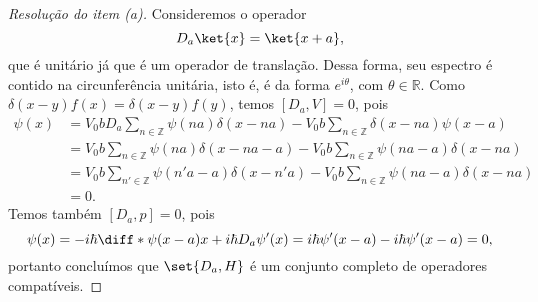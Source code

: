 \begin{proof}[Resolução do item (a)]
    Consideremos o operador
    \begin{equation*}
        D_a \ket{x} = \ket{x + a},
    \end{equation*}
    que é unitário já que é um operador de translação. Dessa forma, seu espectro é contido na circunferência unitária, isto é, é da forma \(e^{i\theta}\), com \(\theta \in \mathbb{R}\). Como \(\delta(x - y)f(x) = \delta(x - y)f(y)\), temos \([D_a, V] = 0\), pois
    \begin{align*}
        [D_a, V]\psi(x) &= V_0 bD_a \sum_{n \in \mathbb{Z}} \psi(na)\delta(x - na) - V_0 b\sum_{n \in \mathbb{Z}} \delta(x - na)\psi(x - a)\\
                        &= V_0 b\sum_{n \in \mathbb{Z}}\psi(na) \delta(x - na - a) - V_0 b\sum_{n \in \mathbb{Z}} \psi(na - a) \delta(x - na)\\
                        &= V_0 b \sum_{n' \in \mathbb{Z}}\psi(n'a - a) \delta(x - n'a) - V_0 b\sum_{n \in \mathbb{Z}} \psi(na - a) \delta(x - na)\\
                        &= 0.
    \end{align*}
    Temos também \([D_a, p] = 0\), pois
    \begin{equation*}
        [D_a, p]\psi(x) = -i\hbar \diff*{\psi(x - a)}{x}  + i\hbar D_a \psi'(x) = i\hbar \psi'(x - a) - i\hbar \psi'(x - a) = 0,
    \end{equation*}
    portanto concluímos que \(\set{D_a, H}\) é um conjunto completo de operadores compatíveis.


\end{proof}
